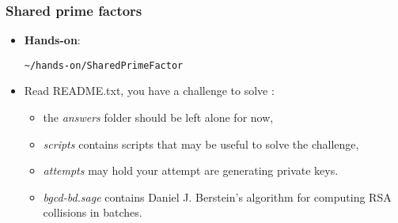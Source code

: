\begin{frame}[fragile]
  \frametitle{Shared prime factors}
  \begin{itemize}
\item {\bf Hands-on}:

\begin{lstlisting}
~/hands-on/SharedPrimeFactor
\end{lstlisting}

\item Read README.txt, you have a challenge to solve :

  \begin{itemize}
  \item the \emph{answers} folder should be left alone for now,
  \item \emph{scripts} contains scripts that may be useful
    to solve the challenge,
  \item \emph{attempts} may hold your attempt are
    generating private keys. 
  \item \emph{bgcd-bd.sage} contains Daniel J. Berstein's algorithm for computing RSA
    collisions in batches.
  \end{itemize}

  \end{itemize}
 
\end{frame}
